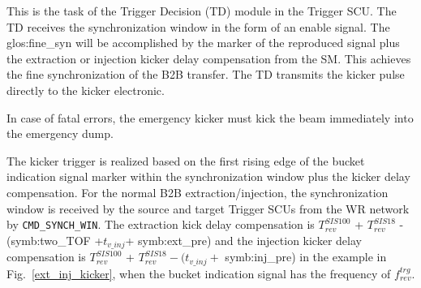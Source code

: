 This is the task of the Trigger Decision (TD) module in the Trigger SCU. The TD receives the synchronization window in the form of an enable signal. The \gls{glos:fine_syn} will be accomplished by the marker of the reproduced signal plus the extraction or injection kicker delay compensation from the SM. This achieves the fine synchronization of the B2B transfer. The TD transmits the kicker pulse directly to the kicker electronic.  
 
In case of fatal errors, the emergency kicker must kick the beam immediately into the emergency dump.

%

The kicker trigger is realized based on the first rising edge of the bucket indication signal marker within the synchronization window plus the kicker delay compensation. For the normal B2B extraction/injection, the synchronization window is received by the source and target Trigger SCUs from the WR network by \verb|CMD_SYNCH_WIN|. The extraction kick delay compensation is $T_{\mathit{rev}}^{\mathit{SIS100}}$ + $T_{\mathit{rev}}^{\mathit{SIS18}}$ -(\gls{symb:two_TOF} +$ t_{v\_inj}$+ \gls{symb:ext_pre}) and the injection kicker delay compensation is $T_{\mathit{rev}}^{\mathit{SIS100}}$ + $T_{\mathit{rev}}^{\mathit{SIS18}} - (t_{v\_inj}+$ \gls{symb:inj_pre}) in the example in Fig.~\ref{ext_inj_kicker}, when the bucket indication signal has the frequency of $f_{\mathit{rev}}^{\mathit{trg}}$. 

